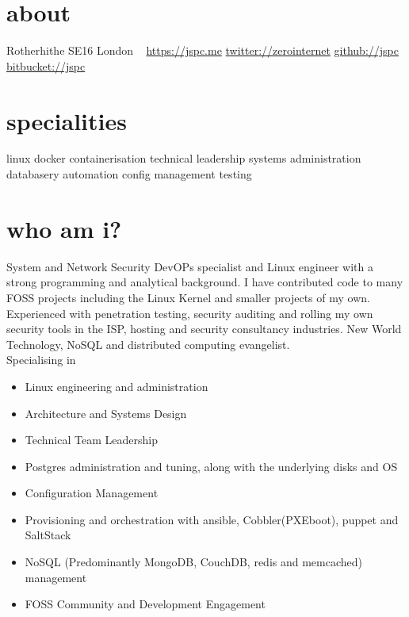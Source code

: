 \documentclass[]{friggeri-cv}
\begin{document}


\begin{aside}
\section{about}
Rotherhithe
SE16 London
~
\href{https://jspc.me}{https://jspc.me}
\href{https://twitter.com/zerointernet}{twitter://zerointernet}
\href{https://github.com/jspc}{github://jspc}
\href{https://bitbucket.org/jspc/}{bitbucket://jspc}
\section{specialities}
linux
docker
containerisation
technical leadership
systems administration
databasery
automation
config management
testing
\end{aside}

\section{who am i?}


System and Network Security DevOPs specialist and Linux engineer with a strong programming and analytical background. I have contributed code to many FOSS projects including the Linux Kernel and smaller projects of my own. Experienced with penetration testing, security auditing and rolling my own security tools in the ISP, hosting and security consultancy industries. New World Technology, NoSQL and distributed computing evangelist.
\\
Specialising in

\begin{itemize}
\item Linux engineering and administration
\item Architecture and Systems Design
\item Technical Team Leadership
\item Postgres administration and tuning, along with the underlying disks and OS
\item Configuration Management
\item Provisioning and orchestration with ansible, Cobbler(PXEboot), puppet and SaltStack
\item NoSQL (Predominantly MongoDB, CouchDB, redis and memcached) management
\item FOSS Community and Development Engagement
\end{itemize}
\end{document}

